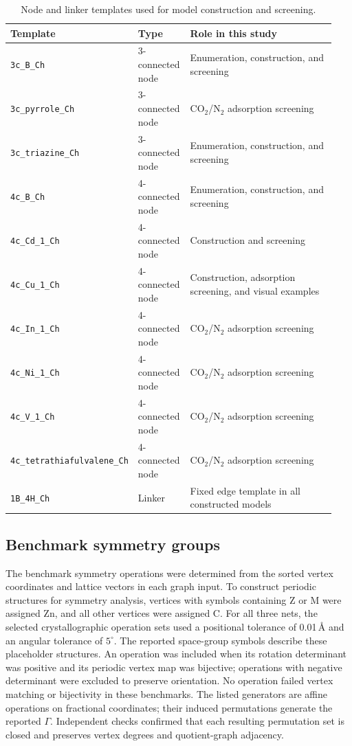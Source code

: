 \documentclass[a5paper, 10pt]{article}
\begin{document}
\begin{table}[H]
\centering
\scriptsize
\setlength{\tabcolsep}{1.2mm}
\renewcommand{\arraystretch}{1.15}
\caption{Node and linker templates used for model construction and screening.}
\label{tab:building_units}
\begin{tabular}{@{}p{0.32\linewidth}p{0.16\linewidth}p{0.46\linewidth}@{}}
\toprule
\textbf{Template} & \textbf{Type} & \textbf{Role in this study} \\
\midrule
\texttt{3c\_B\_Ch} & 3-connected node & Enumeration, construction, and screening \\
\texttt{3c\_pyrrole\_Ch} & 3-connected node & CO$_2$/N$_2$ adsorption screening \\
\texttt{3c\_triazine\_Ch} & 3-connected node & Enumeration, construction, and screening \\
\texttt{4c\_B\_Ch} & 4-connected node & Enumeration, construction, and screening \\
\texttt{4c\_Cd\_1\_Ch} & 4-connected node & Construction and screening \\
\texttt{4c\_Cu\_1\_Ch} & 4-connected node & Construction, adsorption screening, and visual examples \\
\texttt{4c\_In\_1\_Ch} & 4-connected node & CO$_2$/N$_2$ adsorption screening \\
\texttt{4c\_Ni\_1\_Ch} & 4-connected node & CO$_2$/N$_2$ adsorption screening \\
\texttt{4c\_V\_1\_Ch} & 4-connected node & CO$_2$/N$_2$ adsorption screening \\
\texttt{4c\_tetrathiafulvalene\_Ch} & 4-connected node & CO$_2$/N$_2$ adsorption screening \\
\texttt{1B\_4H\_Ch} & Linker & Fixed edge template in all constructed models \\
\bottomrule
\end{tabular}
\end{table}

\subsection{Benchmark symmetry groups}
\label{app:benchmark_symmetry}

The benchmark symmetry operations were determined from the sorted vertex coordinates and lattice vectors in each graph input. To construct periodic structures for symmetry analysis, vertices with symbols containing Z or M were assigned Zn, and all other vertices were assigned C. For all three nets, the selected crystallographic operation sets used a positional tolerance of 0.01\,\AA{} and an angular tolerance of $5^\circ$. The reported space-group symbols describe these placeholder structures. An operation was included when its rotation determinant was positive and its periodic vertex map was bijective; operations with negative determinant were excluded to preserve orientation. No operation failed vertex matching or bijectivity in these benchmarks. The listed generators are affine operations on fractional coordinates; their induced permutations generate the reported $\Gamma$. Independent checks confirmed that each resulting permutation set is closed and preserves vertex degrees and quotient-graph adjacency.
\end{document}
